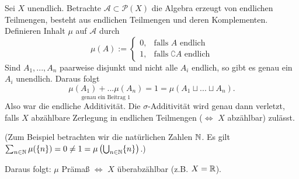 \begin{example}
Sei $X$ unendlich. Betrachte $\mathcal{A} \subset \mathcal{P}(X)$ die Algebra erzeugt von endlichen Teilmengen, besteht aus endlichen Teilmengen und deren Komplementen. Definieren Inhalt $\mu$ auf $\mathcal{A}$ durch
$$ \mu (A) := \begin{cases}
	0, & \text{falls } A \text{ endlich} \\
	1, & \text{falls } \complement A \text{ endlich}
	\end{cases}$$
Sind $A_1,...,A_n$ paarweise disjunkt und nicht alle $A_i$ endlich, so gibt es genau ein $A_i$ unendlich. Daraus folgt
$$\underset{\text{genau ein Beitrag }1}{\mu(A_1)+...\mu(A_n)} = 1 = \mu(A_1 \sqcup ... \sqcup A_n).$$
Also war die endliche Additivität. Die $\sigma$-Additivität wird genau dann verletzt, falls $X$ abzählbare Zerlegung in endlichen Teilmengen ($\iff$ $X$ abzählbar) zulässt. \begin{small}(Zum Beispiel betrachten wir die natürlichen Zahlen $\mathbb{N}$. Es gilt $\sum_{n\in \mathbb{N}} \mu (\{n\}) =0 \neq 1 = \mu \left( \bigcup_{n \in \mathbb{N}} \{n\} \right)$.)
\end{small} Daraus folgt: $\mu $ Prämaß $\iff$ $X$ überabzählbar (z.B. $X = \mathbb{R}$).
\end{example}

